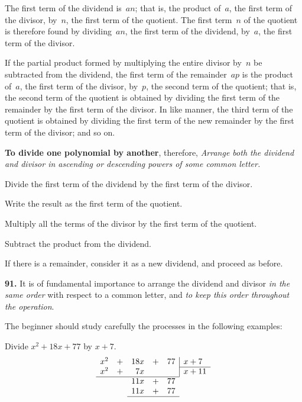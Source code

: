 \documentclass[12pt]{book}[2005/09/16]
\makeatletter
\newcommand{\Require}[1][2\baselineskip]{%
  \setlength{\TmpLen}{\pagegoal-\pagetotal}%
  \ifthenelse{\lengthtest{0pt < \TmpLen}\and\lengthtest{\TmpLen < #1}}{%
    \vfil\newpage%
  }{}%
}
\newcommand{\Paragraph}[1]{\medskip\par\textbf{#1}}
\newcommand{\Dictum}[1]{\Require\textbf{#1}}
\newenvironment{Theorem}[1][]{%
  \ifthenelse{\not\equal{#1}{nopar}}{\smallskip\par#1}{}%
  \itshape}{\medskip\upshape\par}
\newcommand{\Item}[1]{\vspace{4pt plus 16pt}\makebox[1em][r]{\textbf{#1}\ }}
\newlength{\TmpLen}
\newcommand{\NoBar}[1]{\multicolumn{1}{@{}r}{#1}}
\makeatother
\begin{document}
The first term of the dividend is~$an$; that is, the product
of~$a$, the first term of the divisor, by~$n$, the first term of the
quotient.  The first term~$n$ of the quotient is therefore
found by dividing~$an$, the first term of the dividend, by~$a$,
the first term of the divisor.

If the partial product formed by multiplying the entire
divisor by~$n$ be subtracted from the dividend, the first term
of the remainder~$ap$ is the product of~$a$, the first term of
the divisor, by~$p$, the second term of the quotient; that is,
the second term of the quotient is obtained by dividing the
first term of the remainder by the first term of the divisor.
In like manner, the third term of the quotient is obtained
by dividing the first term of the new remainder by the first
term of the divisor; and so on.

\Dictum{To divide one polynomial by another}, therefore,
\begin{Theorem}
Arrange both the dividend and divisor in ascending or
descending powers of some common letter.

Divide the first term of the dividend by the first term of
the divisor.

Write the result as the first term of the quotient.

Multiply all the terms of the divisor by the first term of
the quotient.

Subtract the product from the dividend.

If there is a remainder, consider it as a new dividend,
and proceed as before.
\end{Theorem}

\Paragraph{91.}  It is of fundamental importance to arrange the dividend
and divisor \emph{in the same order} with respect to a common
letter, and \emph{to keep this order throughout the operation}.

The beginner should study carefully the processes in the
following examples:

\Item{1.}  Divide $x^{2} + 18x + 77$ by $x + 7$.
\[
\begin{array}{r*{2}{cr}|l}
x^{2} &+& 18x &+& 77 & x + 7 \\
\cline{6-6}
x^{2} &+&  7x & &    & x + 11 \\
\cline{1-5}
      & & 11x &+& \NoBar{77} \\
      & & 11x &+& \NoBar{77} \\
\cline{3-5}
\end{array}
\]
\end{document}
